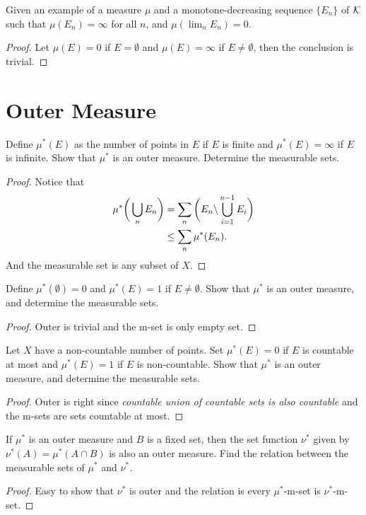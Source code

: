 \begin{pro}%
	Given an example of a measure $\mu$ and a monotone-decreasing sequence $\{E_n\}$ of $\mathcal{K}$ such that $\mu(E_n)=\infty$ for all $n$, and $\mu(\lim_n E_n)=0$.
\end{pro}
\begin{proof}
	Let $\mu(E)=0$ if $E=\emptyset$ and $\mu(E)=\infty$ if $E\neq\emptyset$, then the conclusion is trivial.
\end{proof}

\section{Outer Measure}
\begin{pro}%
	Define $\mu^*(E)$ as the number of points in $E$ if $E$ is finite and $\mu^*(E)=\infty$ if $E$ is infinite. Show that $\mu^*$ is an outer measure. Determine the measurable sets.
\end{pro}
\begin{proof}
	Notice that 
	\begin{align*}
		\mu^*\bigg(\bigcup_n E_n\bigg)&=\sum_n \bigg(E_n\backslash\bigcup_{i=1}^{n-1} E_i\bigg)\\
		&\leq \sum_n \mu^*(E_n).
	\end{align*}And the measurable set is any subset of $X$.
\end{proof}

\begin{pro}%
	Define $\mu^*(\emptyset)=0$ and $\mu^*(E)=1$ if $E\neq\emptyset$. Show that $\mu^*$ is an outer measure, and determine the measurable sets.
\end{pro}
\begin{proof}
	Outer is trivial and the m-set is only empty set.
\end{proof}

\begin{pro}%
	Let $X$ have a non-countable number of points. Set $\mu^*(E)=0$ if $E$ is countable at most and $\mu^*(E)=1$ if $E$ is non-countable. Show that $\mu^*$ is an outer measure, and determine the measurable sets.
\end{pro}
\begin{proof}
	Outer is right since \emph{countable union of countable sets is also countable} and the m-sets are sets countable at most.
\end{proof}

\begin{pro}%
	If $\mu^*$ is an outer measure and $B$ is a fixed set, then the set function $\nu^*$ given by $\nu^*(A)=\mu^*(A\cap B)$ is also an outer measure. Find the relation between the measurable sets of $\mu^*$ and $\nu^*$.
\end{pro}
\begin{proof}
	Easy to show that $\nu^*$ is outer and the relation is every $\mu^*$-m-set is $\nu^*$-m-set.
\end{proof}

